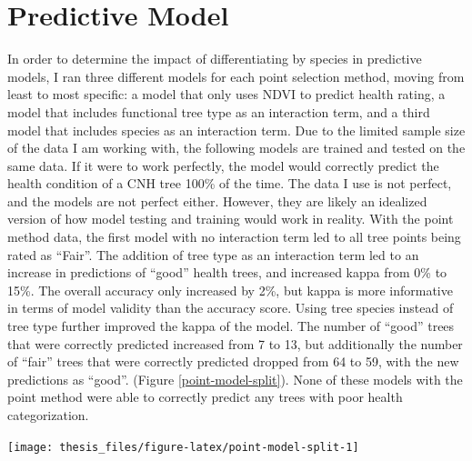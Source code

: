 \documentclass[12pt,twoside]{reedthesis}
\begin{document}
\hypertarget{predictive-model}{%
\section{Predictive Model}\label{predictive-model}}

In order to determine the impact of differentiating by species in predictive models, I ran three different models for each point selection method, moving from least to most specific: a model that only uses NDVI to predict health rating, a model that includes functional tree type as an interaction term, and a third model that includes species as an interaction term. Due to the limited sample size of the data I am working with, the following models are trained and tested on the same data. If it were to work perfectly, the model would correctly predict the health condition of a CNH tree 100\% of the time. The data I use is not perfect, and the models are not perfect either. However, they are likely an idealized version of how model testing and training would work in reality.
With the point method data, the first model with no interaction term led to all tree points being rated as ``Fair''. The addition of tree type as an interaction term led to an increase in predictions of ``good'' health trees, and increased kappa from 0\% to 15\%. The overall accuracy only increased by 2\%, but kappa is more informative in terms of model validity than the accuracy score. Using tree species instead of tree type further improved the kappa of the model. The number of ``good'' trees that were correctly predicted increased from 7 to 13, but additionally the number of ``fair'' trees that were correctly predicted dropped from 64 to 59, with the new predictions as ``good''. (Figure \ref{point-model-split}). None of these models with the point method were able to correctly predict any trees with poor health categorization.

\texttt{[image: thesis\_files/figure-latex/point-model-split-1]}
\end{document}
